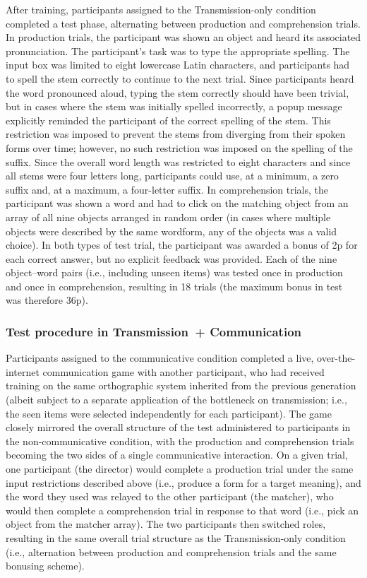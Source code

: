 \documentclass[doc,biblatex]{apa7}
\begin{document}
After training, participants assigned to the Transmission-only condition completed a test phase, alternating between production and comprehension trials. In production trials, the participant was shown an object and heard its associated pronunciation. The participant's task was to type the appropriate spelling. The input box was limited to eight lowercase Latin characters, and participants had to spell the stem correctly to continue to the next trial. Since participants heard the word pronounced aloud, typing the stem correctly should have been trivial, but in cases where the stem was initially spelled incorrectly, a popup message explicitly reminded the participant of the correct spelling of the stem. This restriction was imposed to prevent the stems from diverging from their spoken forms over time; however, no such restriction was imposed on the spelling of the suffix. Since the overall word length was restricted to eight characters and since all stems were four letters long, participants could use, at a minimum, a zero suffix and, at a maximum, a four-letter suffix. In comprehension trials, the participant was shown a word and had to click on the matching object from an array of all nine objects arranged in random order (in cases where multiple objects were described by the same wordform, any of the objects was a valid choice). In both types of test trial, the participant was awarded a bonus of 2p for each correct answer, but no explicit feedback was provided. Each of the nine object--word pairs (i.e., including unseen items) was tested once in production and once in comprehension, resulting in 18 trials (the maximum bonus in test was therefore 36p).

\subsubsection{Test procedure in Transmission~+ Communication}

Participants assigned to the communicative condition completed a live, over-the-internet communication game with another participant, who had received training on the same orthographic system inherited from the previous generation (albeit subject to a separate application of the bottleneck on transmission; i.e., the seen items were selected independently for each participant). The game closely mirrored the overall structure of the test administered to participants in the non-communicative condition, with the production and comprehension trials becoming the two sides of a single communicative interaction. On a given trial, one participant (the director) would complete a production trial under the same input restrictions described above (i.e., produce a form for a target meaning), and the word they used was relayed to the other participant (the matcher), who would then complete a comprehension trial in response to that word (i.e., pick an object from the matcher array). The two participants then switched roles, resulting in the same overall trial structure as the Transmission-only condition (i.e., alternation between production and comprehension trials and the same bonusing scheme).
\end{document}
